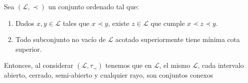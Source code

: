 \documentclass[12pt]{report}
\theoremstyle{largebreak}
\begin{document}
    \renewcommand{\theenumi}{\arabic{enumi}}
    
    \begin{propo}
        Sea $(\mathcal{L},\prec)$ un conjunto ordenado tal que:
        \begin{enumerate}
            \item Dados $x,y\in\mathcal{L}$ tales que $x\prec y$, existe $z\in\mathcal{L}$ que cumple $x\prec z\prec y$.
            \item Todo subconjunto no vacío de $\mathcal{L}$ acotado superiormente tiene mínima cota superior.
        \end{enumerate}
        Entonces, al considerar $(\mathcal{L},\tau_{\prec})$ tenemos que en $\mathcal{L}$, el mismo $\mathcal{L}$, cada intervalo abierto, cerrado, semi-abierto y cualquier rayo, son conjuntos conexos
    \end{propo}
\end{document}
